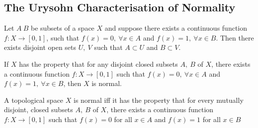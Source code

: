 
\subsection{The Urysohn Characterisation of Normality}
\begin{proposition}
	Let $A\ B$ be subsets of a space $X$ and suppose there exists a continuous function $f:X \to [0,1]$, such that $f(x)=0,\ \forall x \in A$ and $f(x)=1,\ \forall x \in B$. Then there exists disjoint open sets $U,\ V$ such that $A \subset U$ and $B \subset V$.
\end{proposition}

\begin{corollary}
	If $X$ has the property that for any disjoint closed subsets $A,\ B$ of $X$, there exists a continuous function $f : X \to [0,1]$ such that $f(x)=0,\ \forall x \in A$ and $f(x)=1,\ \forall x \in B$, then $X$ is normal.
\end{corollary}

\begin{theorem}
	A topological space $X$ is normal iff it has the property that for every mutually disjoint, closed subsets $A,\ B$ of $X$, there exists a continuous function \( f : X \to [0,1] \) such that \( f(x) = 0 \) for all $x \in A$ and \( f(x) = 1 \) for all \( x \in B \)
\end{theorem}

